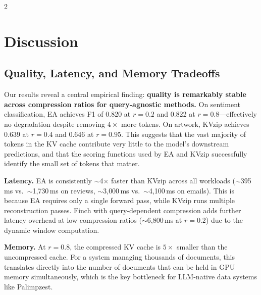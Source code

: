 \documentclass[10pt,a4paper]{article}
\begin{document}
\begin{multicols}{2}
\begin{center}
  \centering
  \fbox{\rule{0pt}{3.2cm}\rule{0.9\columnwidth}{0pt}}
  \label{fig:artwork-f1}
\end{center}

\section{Discussion}

\subsection{Quality, Latency, and Memory Tradeoffs}

Our results reveal a central empirical finding: \textbf{quality is
remarkably stable across compression ratios for query-agnostic methods.}
On sentiment classification, EA achieves F1 of 0.820 at $r=0.2$ and
0.822 at $r=0.8$---effectively no degradation despite removing
$4\times$ more tokens. On artwork, KVzip achieves 0.639 at $r=0.4$ and
0.646 at $r=0.95$. This suggests that the vast majority of tokens in
the KV cache contribute very little to the model's downstream
predictions, and that the scoring functions used by EA and KVzip
successfully identify the small set of tokens that matter.

\textbf{Latency.}
EA is consistently $\sim$4$\times$ faster than KVzip across all
workloads ($\sim$395\,ms vs.\ $\sim$1{,}730\,ms on reviews,
$\sim$3{,}000\,ms vs.\ $\sim$4{,}100\,ms on emails). This is because
EA requires only a single forward pass, while KVzip runs multiple
reconstruction passes. Finch with query-dependent compression adds
further latency overhead at low compression ratios
($\sim$6{,}800\,ms at $r=0.2$) due to the dynamic window computation.

\begin{center}
  \centering
  \fbox{\rule{0pt}{3.2cm}\rule{0.9\columnwidth}{0pt}}
  \label{fig:latency}
\end{center}

\textbf{Memory.}
At $r=0.8$, the compressed KV cache is $5\times$ smaller than the
uncompressed cache. For a system managing thousands of documents, this
translates directly into the number of documents that can be held in
GPU memory simultaneously, which is the key bottleneck for LLM-native
data systems like Palimpzest.


\end{multicols}
\end{document}
